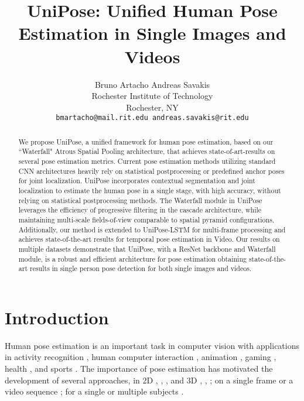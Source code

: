 \documentclass[10pt,twocolumn,letterpaper]{article}
\begin{document}
\title{
UniPose: Unified Human Pose Estimation in Single Images and Videos
}

\author{Bruno Artacho \hspace{2cm} Andreas Savakis \\
Rochester Institute of Technology\\
Rochester, NY\\
{\tt\small bmartacho@mail.rit.edu \hspace{0.5cm} andreas.savakis@rit.edu}}


\maketitle


\begin{abstract}
We propose UniPose, a unified framework for human pose estimation, based on our ``Waterfall" Atrous Spatial Pooling architecture, that achieves state-of-art-results on several pose estimation metrics.
Current pose estimation methods utilizing standard CNN architectures heavily rely on statistical postprocessing or predefined anchor poses for joint localization. 
UniPose incorporates contextual segmentation 
and joint localization to estimate the human pose in a single stage, with high accuracy, without relying on statistical postprocessing methods. 
The Waterfall module in UniPose leverages the efficiency of progressive filtering in the cascade architecture, while maintaining multi-scale fields-of-view comparable to spatial pyramid configurations.
Additionally, our method is extended to UniPose-LSTM for multi-frame processing and achieves state-of-the-art results for temporal pose estimation in Video. 
Our results on multiple datasets demonstrate that  UniPose,  with a ResNet backbone and Waterfall module, is a robust and efficient architecture for pose estimation obtaining state-of-the-art results in single person pose detection for both single images and videos.
\end{abstract}

\section{Introduction}
Human pose estimation is an important task in computer vision with applications in activity recognition \cite{ActionRecognition}, human computer interaction \cite{Gesture4HCI}, animation \cite{Avatar}, gaming \cite{Kinect}, health \cite{RehabPose}, and sports \cite{SportPerformance}. 
The importance of pose estimation
has motivated the development of several approaches, in 2D \cite{DeepPose}, \cite{EfficientPoseCNN}, \cite{HourGlass}, \cite{HRNet} and 3D \cite{LCR-Net}, \cite{Monocap}, \cite{DensePose}; on a single frame \cite{RecurrentPose} or a video sequence \cite{3D_Video_Occlusion-Aware}; for a single \cite{CPM} or multiple subjects \cite{OpenPose}.
\end{document}
